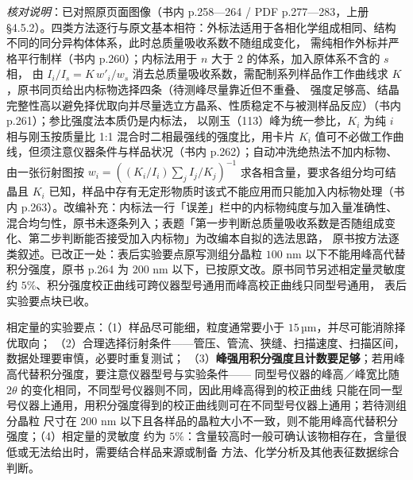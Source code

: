 \emph{核对说明}：已对照原页面图像（书内 p.258—264 / PDF p.277—283，上册 §4.5.2）。四类方法逐行与原文基本相符：外标法适用于各相化学组成相同、结构不同的同分异构体体系，此时总质量吸收系数不随组成变化，
需纯相作外标并严格平行制样（书内 p.260）；内标法用于 $n$ 大于 2 的体系，加入原体系不含的 $s$ 相，
由 $I_i/I_s=K\,w'_i/w_s$ 消去总质量吸收系数，需配制系列样品作工作曲线求 $K$，原书同页给出内标物选择四条（待测峰尽量靠近但不重叠、
强度足够高、结晶完整性高以避免择优取向并尽量选立方晶系、性质稳定不与被测样品反应）（书内 p.261）；参比强度法本质仍是内标法，
以刚玉（113）峰为统一参比，$K_i$ 为纯 $i$ 相与刚玉按质量比 1:1 混合时二相最强线的强度比，用卡片
$K_i$ 值可不必做工作曲线，但须注意仪器条件与样品状况（书内 p.262）；自动冲洗绝热法不加内标物、由一张衍射图按
$w_i=((K_i/I_i)\sum_j I_j/K_j)^{-1}$ 求各相含量，要求各组分均可结晶且 $K_i$
已知，样品中存有无定形物质时该式不能应用而只能加入内标物处理（书内 p.263）。改编补充：内标法一行「误差」栏中的内标物纯度与加入量准确性、
混合均匀性，原书未逐条列入；表题「第一步判断总质量吸收系数是否随组成变化、第二步判断能否接受加入内标物」为改编本自拟的选法思路，
原书按方法逐类叙述。已改正一处：表后实验要点原写测组分晶粒 $100$ nm 以下不能用峰高代替积分强度，原书 p.264
为 $200$ nm 以下，已按原文改。原书同节另述相定量灵敏度约 $5\%$、积分强度校正曲线可跨仪器型号通用而峰高校正曲线只同型号通用，
表后实验要点块已收。


\begin{measure}
相定量的实验要点：（1）样品尽可能细，粒度通常要小于 $15$\,µm，并尽可能消除择优取向；
（2）合理选择衍射条件——管压、管流、狭缝、扫描速度、扫描区间，数据处理要审慎，必要时重复测试；
（3）\textbf{峰强用积分强度且计数要足够}；若用峰高代替积分强度，要注意仪器型号与实验条件——
同型号仪器的峰高／峰宽比随 $2\theta$ 的变化相同，不同型号仪器则不同，因此用峰高得到的校正曲线
只能在同一型号仪器上通用，用积分强度得到的校正曲线则可在不同型号仪器上通用；若待测组分晶粒
尺寸在 $200$ nm 以下且各样品的晶粒大小不一致，则不能用峰高代替积分强度；（4）相定量的灵敏度
约为 $5\%$：含量较高时一般可确认该物相存在，含量很低或无法给出时，需要结合样品来源或制备
方法、化学分析及其他表征数据综合判断。
\end{measure}

